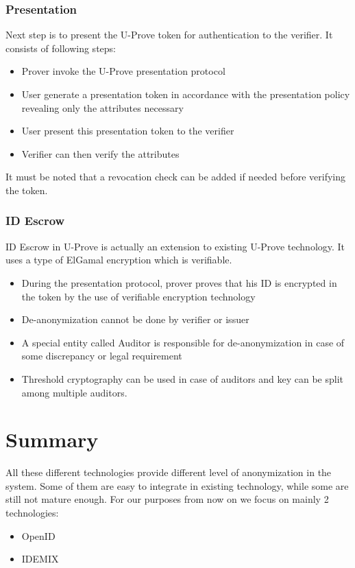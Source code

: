 \subsubsection{Presentation}
Next step is to present the U-Prove token for authentication to the verifier. It consists of following steps:
\begin{itemize}
	\item Prover invoke the U-Prove presentation protocol
	\item User generate a presentation token in accordance with the presentation policy revealing only the attributes necessary
	\item User present this presentation token to the verifier
	\item Verifier can then verify the attributes
\end{itemize}
It must be noted that a revocation check can be added if needed before verifying the token.
\subsubsection{ID Escrow}
ID Escrow in U-Prove is actually an extension to existing U-Prove technology. It uses a type of ElGamal encryption which is verifiable.
\begin{itemize}
	\item  During the presentation protocol, prover proves that his ID is encrypted in the token by the use of verifiable encryption technology
	\item De-anonymization cannot be done by verifier or issuer
	\item A special entity called Auditor is responsible for de-anonymization in case of some discrepancy or legal requirement
	\item Threshold cryptography can be used in case of auditors and key can be split among multiple auditors.
\end{itemize}
\section{Summary}
All these different technologies provide different level of anonymization in the system. Some of them are easy to integrate in existing technology, while some are still not mature enough. For our purposes from now on we focus on mainly 2 technologies:
\begin{itemize}
	\item OpenID
	\item IDEMIX
\end{itemize}